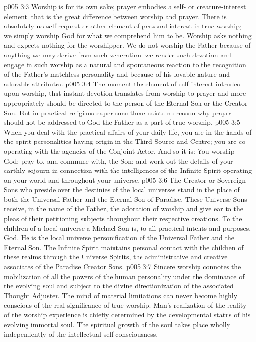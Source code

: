 \vs p005 3:3 Worship is for its own sake; prayer embodies a self\hyp{} or creature\hyp{}interest element; that is the great difference between worship and prayer. There is absolutely no self\hyp{}request or other element of personal interest in true worship; we simply worship God for what we comprehend him to be. Worship asks nothing and expects nothing for the worshipper. We do not worship the Father because of anything we may derive from such veneration; we render such devotion and engage in such worship as a natural and spontaneous reaction to the recognition of the Father’s matchless personality and because of his lovable nature and adorable attributes.
\vs p005 3:4 The moment the element of self\hyp{}interest intrudes upon worship, that instant devotion translates from worship to prayer and more appropriately should be directed to the person of the Eternal Son or the Creator Son. But in practical religious experience there exists no reason why prayer should not be addressed to God the Father as a part of true worship.
\vs p005 3:5 When you deal with the practical affairs of your daily life, you are in the hands of the spirit personalities having origin in the Third Source and Centre; you are co\hyp{}operating with the agencies of the Conjoint Actor. And so it is: You worship God; pray to, and commune with, the Son; and work out the details of your earthly sojourn in connection with the intelligences of the Infinite Spirit operating on your world and throughout your universe.
\vs p005 3:6 \pc The Creator or Sovereign Sons who preside over the destinies of the local universes stand in the place of both the Universal Father and the Eternal Son of Paradise. These Universe Sons receive, in the name of the Father, the adoration of worship and give ear to the pleas of their petitioning subjects throughout their respective creations. To the children of a local universe a Michael Son is, to all practical intents and purposes, God. He is the local universe personification of the Universal Father and the Eternal Son. The Infinite Spirit maintains personal contact with the children of these realms through the Universe Spirits, the administrative and creative associates of the Paradise Creator Sons.
\vs p005 3:7 \pc Sincere worship connotes the mobilization of all the powers of the human personality under the dominance of the evolving soul and subject to the divine directionization of the associated Thought Adjuster. The mind of material limitations can never become highly conscious of the real significance of true worship. Man’s realization of the reality of the worship experience is chiefly determined by the developmental status of his evolving immortal soul. The spiritual growth of the soul takes place wholly independently of the intellectual self\hyp{}consciousness.
